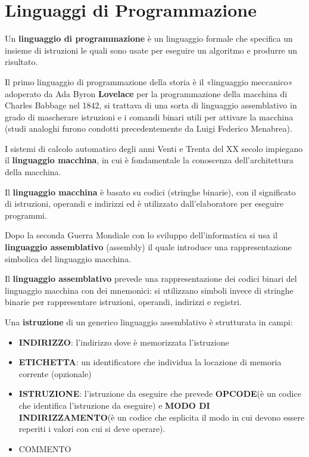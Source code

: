 \documentclass[12pt]{article} %
\begin{document}
\section{Linguaggi di Programmazione}
Un \textbf{linguaggio di programmazione} è un linguaggio formale che specifica un insieme di istruzioni le quali sono usate per eseguire un algoritmo e produrre un risultato.\par\medskip\noindent
Il primo linguaggio di programmazione della storia è il «linguaggio meccanico» adoperato da Ada Byron \textbf{Lovelace} per la programmazione della macchina di Charles Babbage nel 1842, si trattava di una sorta di linguaggio assemblativo in grado di mascherare istruzioni e i comandi binari utili per attivare la macchina (studi analoghi furono condotti precedentemente da Luigi Federico Menabrea).\par\medskip\noindent
I sistemi di calcolo automatico degli anni Venti e Trenta del XX secolo impiegano il \textbf{linguaggio macchina}, in cui è fondamentale la conoscenza dell'architettura della macchina.\par\medskip\noindent 
Il \textbf{linguaggio macchina} è basato su codici (stringhe binarie), con il significato di istruzioni, operandi e indirizzi ed è utilizzato dall’elaboratore per eseguire programmi.\par\medskip\noindent
Dopo la seconda Guerra Mondiale con lo sviluppo dell'informatica si usa il \textbf{linguaggio assemblativo} (assembly) il quale introduce una rappresentazione simbolica del linguaggio macchina.\par\medskip\noindent
Il \textbf{linguaggio assemblativo} prevede una rappresentazione dei codici binari del linguaggio macchina con dei mnemonici: si utilizzano simboli invece di stringhe binarie per rappresentare istruzioni, operandi, indirizzi e registri.\par\medskip\noindent
\newpage
Una \textbf{istruzione} di un generico linguaggio assemblativo è strutturata in campi:
\begin{itemize}
\item \textbf{INDIRIZZO}: l’indirizzo dove è memorizzata l’istruzione
\item \textbf{ETICHETTA}: un identificatore che individua la locazione di memoria corrente (opzionale)
\item \textbf{ISTRUZIONE}: l’istruzione da eseguire che prevede \textbf{OPCODE}(è un codice che identifica l’istruzione da eseguire) e  \textbf{MODO DI INDIRIZZAMENTO}(è un codice che esplicita il modo in cui devono essere reperiti i valori con cui si deve operare).
\item COMMENTO
\end{itemize}
\end{document}

